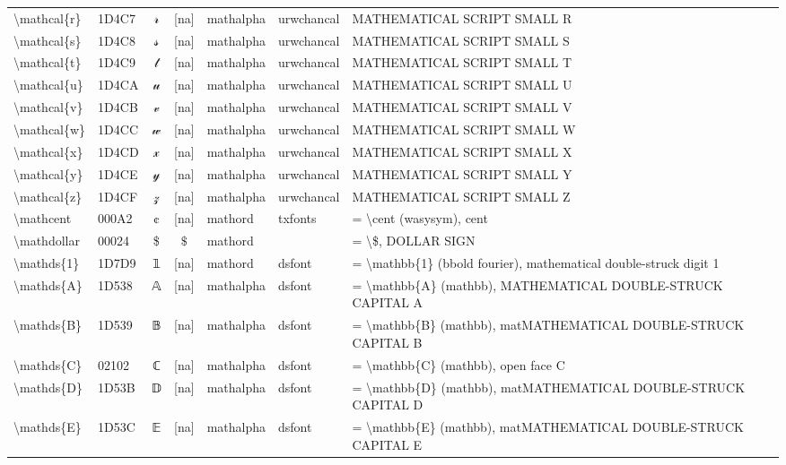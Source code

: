 \documentclass[a4paper,landscape]{article}
\begin{document}
\begin{longtable}{llcclll}
\textbackslash{}mathcal\{r\} & 1D4C7 & 𝓇 & [na] & mathalpha & urwchancal & MATHEMATICAL SCRIPT SMALL R \\
\textbackslash{}mathcal\{s\} & 1D4C8 & 𝓈 & [na] & mathalpha & urwchancal & MATHEMATICAL SCRIPT SMALL S \\
\textbackslash{}mathcal\{t\} & 1D4C9 & 𝓉 & [na] & mathalpha & urwchancal & MATHEMATICAL SCRIPT SMALL T \\
\textbackslash{}mathcal\{u\} & 1D4CA & 𝓊 & [na] & mathalpha & urwchancal & MATHEMATICAL SCRIPT SMALL U \\
\textbackslash{}mathcal\{v\} & 1D4CB & 𝓋 & [na] & mathalpha & urwchancal & MATHEMATICAL SCRIPT SMALL V \\
\textbackslash{}mathcal\{w\} & 1D4CC & 𝓌 & [na] & mathalpha & urwchancal & MATHEMATICAL SCRIPT SMALL W \\
\textbackslash{}mathcal\{x\} & 1D4CD & 𝓍 & [na] & mathalpha & urwchancal & MATHEMATICAL SCRIPT SMALL X \\
\textbackslash{}mathcal\{y\} & 1D4CE & 𝓎 & [na] & mathalpha & urwchancal & MATHEMATICAL SCRIPT SMALL Y \\
\textbackslash{}mathcal\{z\} & 1D4CF & 𝓏 & [na] & mathalpha & urwchancal & MATHEMATICAL SCRIPT SMALL Z \\
\textbackslash{}mathcent & 000A2 & ¢ & [na] & mathord & txfonts & = \textbackslash{}cent (wasysym),  cent \\
\textbackslash{}mathdollar & 00024 & \$ & $\mathdollar$ & mathord &  & = \textbackslash{}\$,  DOLLAR SIGN \\
\textbackslash{}mathds\{1\} & 1D7D9 & 𝟙 & [na] & mathord & dsfont & = \textbackslash{}mathbb\{1\} (bbold fourier),  mathematical double-struck digit 1 \\
\textbackslash{}mathds\{A\} & 1D538 & 𝔸 & [na] & mathalpha & dsfont & = \textbackslash{}mathbb\{A\} (mathbb),  MATHEMATICAL DOUBLE-STRUCK CAPITAL A \\
\textbackslash{}mathds\{B\} & 1D539 & 𝔹 & [na] & mathalpha & dsfont & = \textbackslash{}mathbb\{B\} (mathbb),  matMATHEMATICAL DOUBLE-STRUCK CAPITAL B \\
\textbackslash{}mathds\{C\} & 02102 & ℂ & [na] & mathalpha & dsfont & = \textbackslash{}mathbb\{C\} (mathbb),  open face C \\
\textbackslash{}mathds\{D\} & 1D53B & 𝔻 & [na] & mathalpha & dsfont & = \textbackslash{}mathbb\{D\} (mathbb),  matMATHEMATICAL DOUBLE-STRUCK CAPITAL D \\
\textbackslash{}mathds\{E\} & 1D53C & 𝔼 & [na] & mathalpha & dsfont & = \textbackslash{}mathbb\{E\} (mathbb),  matMATHEMATICAL DOUBLE-STRUCK CAPITAL E \\

\end{longtable}
\end{document}
